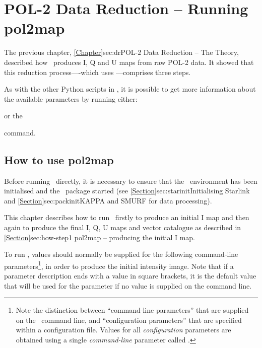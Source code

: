 \chapter{POL-2 Data Reduction -- Running
  pol2map}
\label{sec:rundr}

The previous chapter, \cref{Chapter}{sec:dr}{POL-2 Data Reduction --
  The Theory}, described how \poltwomap\ produces I, Q and U maps from raw
POL-2 data.  It showed that this reduction process----which uses
\poltwomap---comprises three steps.

As with the other Python scripts in \SMURF, it is possible to get more
information about the available parameters by running either:
\begin{terminalv}
\end{terminalv}
or the
\begin{terminalv}
\end{terminalv}
command.

\section{How to use pol2map}

Before running \poltwomap\ directly, it is necessary to ensure that
the \starlink\ environment has been initialised and the \smurf\
package started (see \cref{Section}{sec:starinit}{Initialising
  Starlink} and \cref{Section}{sec:packinit}{KAPPA and SMURF for data
  processing}).

This chapter describes how to run \poltwomap\ firstly to produce an
initial I map and then again to produce the final I, Q, U maps and
vector catalogue as described in \cref{Section}{sec:how-step1}{
pol2map -- producing the initial I map}.

To run \poltwomap, values should normally be supplied for the following
command-line parameters\footnote{Note the distinction between
  ``command-line parameters'' that are supplied on the
  \poltwomap\ command line, and ``configuration parameters'' that
  are specified within a configuration file. Values for all
  \emph{configuration} parameters are obtained using a single
  \emph{command-line} parameter called .}, in order to
  produce the initial intensity image. Note that if a parameter description ends
  with a value in square brackets, it is the default value that will be used for
the parameter if no value is supplied on the command line.


